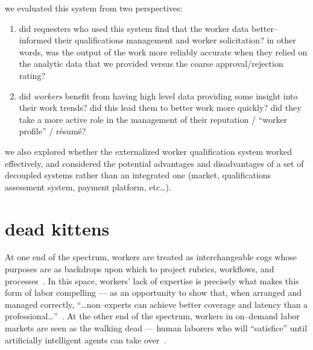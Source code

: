 \documentclass[main]{subfiles}
\begin{document}
  we evaluated this system from two perspectives:
  \begin{enumerate}
    \item did requesters who used this system find that the worker data better--informed their qualifications management and worker solicitation?
          in other words, was the output of the work more reliably accurate when they relied on the analytic data that we provided versus the coarse approval/rejection rating?
    \item did \textit{workers} benefit from having high level data providing some insight into their work trends? did this lead them to better work more quickly? did they take a more active role in the management of their reputation / ``worker profile'' / r\'{e}sum\'{e}?
  \end{enumerate}
  we also explored whether the externalized worker qualification system worked effectively, and considered the potential advantages and disadvantages of a set of decoupled systems rather than an integrated one (market, qualifications assessment system, payment platform, etc\dots).


\section{dead kittens}
At one end of the spectrum,
workers are treated as interchangeable cogs whose purposes are as
backdrops upon which to project rubrics, workflows, and processes~\cite{yuanAlmost}.
In this space, workers' lack of expertise is precisely what makes this form of labor compelling ---
as an opportunity to show that, when arranged and managed correctly,
``\dots non--experts can achieve better coverage and latency than a professional\dots''~\cite{lasecki2012real}.
At the other end of the spectrum,
workers in on--demand labor markets are seen as the walking dead ---
human laborers who will ``satisfice'' until artificially intelligent agents can take over~.
\end{document}
